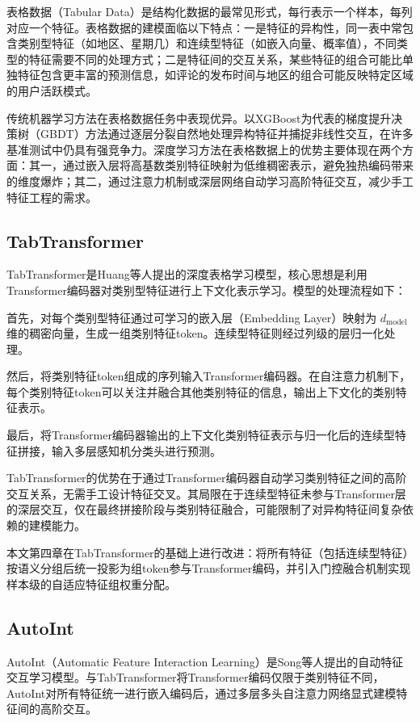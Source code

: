 表格数据（Tabular Data）是结构化数据的最常见形式，每行表示一个样本，每列对应一个特征。表格数据的建模面临以下特点：一是特征的异构性，同一表中常包含类别型特征（如地区、星期几）和连续型特征（如嵌入向量、概率值），不同类型的特征需要不同的处理方式；二是特征间的交互关系，某些特征的组合可能比单独特征包含更丰富的预测信息，如评论的发布时间与地区的组合可能反映特定区域的用户活跃模式。

传统机器学习方法在表格数据任务中表现优异。以XGBoost\cite{chen2016xgboost}为代表的梯度提升决策树（GBDT）方法通过逐层分裂自然地处理异构特征并捕捉非线性交互，在许多基准测试中仍具有强竞争力\cite{grinsztajn2022tree}。深度学习方法在表格数据上的优势主要体现在两个方面\cite{gorishniy2021revisiting}：其一，通过嵌入层将高基数类别特征映射为低维稠密表示，避免独热编码带来的维度爆炸；其二，通过注意力机制或深层网络自动学习高阶特征交互，减少手工特征工程的需求。

\subsection{TabTransformer}

TabTransformer是Huang等人\cite{huang2020tabtransformer}提出的深度表格学习模型，核心思想是利用Transformer编码器对类别型特征进行上下文化表示学习。模型的处理流程如下：

首先，对每个类别型特征通过可学习的嵌入层（Embedding Layer）映射为 $d_{\text{model}}$ 维的稠密向量，生成一组类别特征token。连续型特征则经过列级的层归一化处理。

然后，将类别特征token组成的序列输入Transformer编码器。在自注意力机制下，每个类别特征token可以关注并融合其他类别特征的信息，输出上下文化的类别特征表示。

最后，将Transformer编码器输出的上下文化类别特征表示与归一化后的连续型特征拼接，输入多层感知机分类头进行预测。

TabTransformer的优势在于通过Transformer编码器自动学习类别特征之间的高阶交互关系，无需手工设计特征交叉。其局限在于连续型特征未参与Transformer层的深层交互，仅在最终拼接阶段与类别特征融合，可能限制了对异构特征间复杂依赖的建模能力。

本文第四章在TabTransformer的基础上进行改进：将所有特征（包括连续型特征）按语义分组后统一投影为组token参与Transformer编码，并引入门控融合机制实现样本级的自适应特征组权重分配。

\subsection{AutoInt}

AutoInt（Automatic Feature Interaction Learning）是Song等人\cite{song2019autoint}提出的自动特征交互学习模型。与TabTransformer将Transformer编码仅限于类别特征不同，AutoInt对所有特征统一进行嵌入编码后，通过多层多头自注意力网络显式建模特征间的高阶交互。

